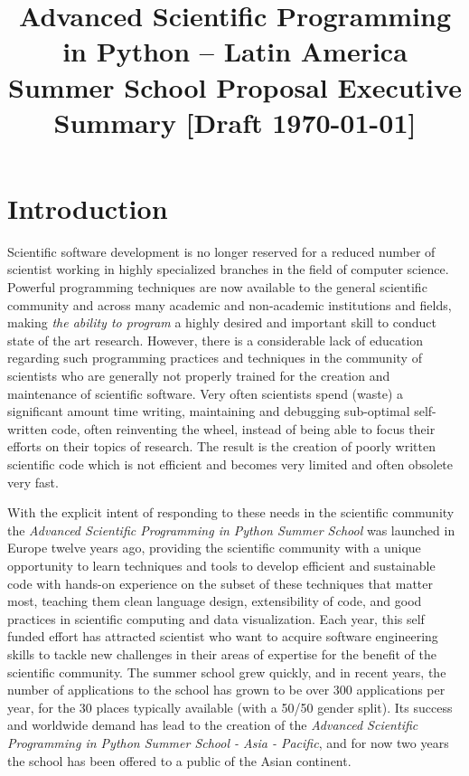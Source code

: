 \documentclass{article}[11pt]
\title{%
\Large Advanced Scientific Programming in Python  -- Latin America
\\ \vspace{0.2cm}
\large Summer School Proposal  Executive Summary  [Draft \today]}
\date{}
\author{}
\begin{document}
\maketitle


\vspace*{-1.2cm}
\section*{Introduction}
Scientific software development is no longer reserved for a reduced number of
scientist working in highly specialized branches in the field of computer
science. Powerful programming techniques are now available to the general
scientific community and across many academic and non-academic institutions and
fields, making \emph{the ability to program} a highly desired and important
skill to conduct state of the art research. However, there is a considerable
lack of education regarding such programming practices and techniques in
the community of scientists who are generally not properly trained for the
creation and maintenance of scientific software. Very often scientists spend
(waste) a significant amount time writing, maintaining and debugging
sub-optimal self-written code, often reinventing the wheel, instead of being
able to focus their efforts on their topics of research. The result is the
creation of poorly written scientific code which is not efficient and becomes
very limited and often obsolete very fast.

With the explicit intent of responding to these needs in the scientific
community the \emph{Advanced Scientific Programming in Python Summer School}
was launched in Europe twelve years ago, providing the scientific community
with a unique opportunity to learn techniques and tools to develop efficient
and sustainable code with hands-on experience on the subset of these techniques
that matter most, teaching them clean language design, extensibility of code,
and good practices in scientific computing and data visualization. Each year,
this self funded effort has attracted scientist who want to acquire software
engineering skills to tackle new challenges in their areas of expertise for
the  benefit of the scientific community. The summer school grew quickly, and
in recent years, the number of applications  to the school has grown to be over
300 applications per year, for the 30 places typically available (with a 50/50
gender split). Its success and worldwide demand has lead to the creation of the \emph{Advanced Scientific Programming in Python Summer School - Asia - Pacific}, and for now two years the school has been offered to a public of the Asian continent.
\end{document}
